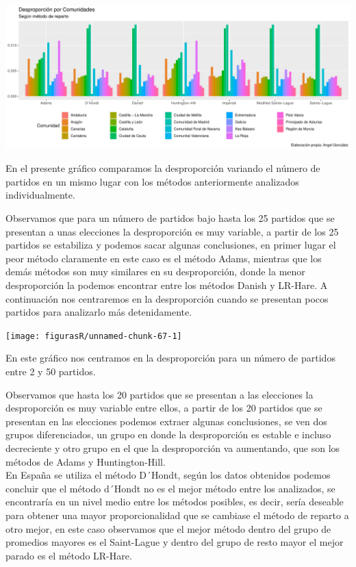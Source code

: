 \documentclass[12pt,a4paper,]{book}
\numberwithin{dummy}{section}
\theoremstyle{ocrenumbox}
\theoremstyle{blacknumex}
\theoremstyle{blacknumbox}
\theoremstyle{ocrenum}
\theoremstyle{ocrenum}
\begin{document}
\begin{center}\includegraphics[width=0.95\linewidth]{figurasR/unnamed-chunk-66-1} \end{center}

En el presente gráfico comparamos la desproporción variando el número de
partidos en un mismo lugar con los métodos anteriormente analizados
individualmente.

Observamos que para un número de partidos bajo hasta los 25 partidos que
se presentan a unas elecciones la desproporción es muy variable, a
partir de los 25 partidos se estabiliza y podemos sacar algunas
conclusiones, en primer lugar el peor método claramente en este caso es
el método Adams, mientras que los demás métodos son muy similares en su
desproporción, donde la menor desproporción la podemos encontrar entre
los métodos Danish y LR-Hare. A continuación nos centraremos en la
desproporción cuando se presentan pocos partidos para analizarlo más
detenidamente.

\begin{center}\texttt{[image: figurasR/unnamed-chunk-67-1]} \end{center}

En este gráfico nos centramos en la desproporción para un número de
partidos entre 2 y 50 partidos.

Observamos que hasta los 20 partidos que se presentan a las elecciones
la desproporción es muy variable entre ellos, a partir de los 20
partidos que se presentan en las elecciones podemos extraer algunas
conclusiones, se ven dos grupos diferenciados, un grupo en donde la
desproporción es estable e incluso decreciente y otro grupo en el que la
desproporción va aumentando, que son los métodos de Adams y
Huntington-Hill.\\
En España se utiliza el método D´Hondt, según los datos obtenidos
podemos concluir que el método d´Hondt no es el mejor método entre los
analizados, se encontraría en un nivel medio entre los métodos posibles,
es decir, sería deseable para obtener una mayor proporcionalidad que se
cambiase el método de reparto a otro mejor, en este caso observamos que
el mejor método dentro del grupo de promedios mayores es el Saint-Lague
y dentro del grupo de resto mayor el mejor parado es el método LR-Hare.
\end{document}
